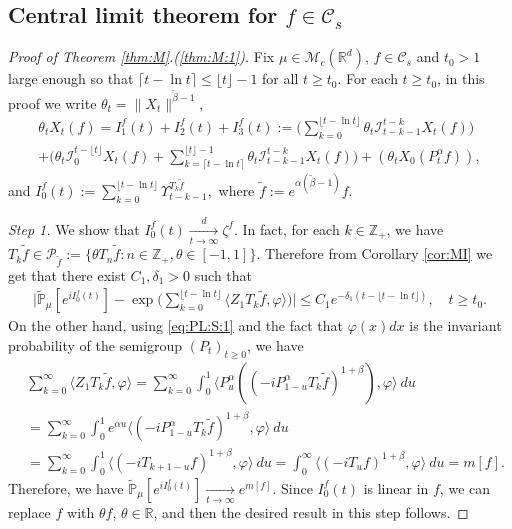 \documentclass[12pt,a4paper]{amsart}
\theoremstyle{plain}
\theoremstyle{definition}
\numberwithin{equation}{section}
\begin{document}
\subsection{Central limit theorem for $f\in \mathcal C_s$}
\label{sec: small rate}

\begin{proof}[Proof of Theorem \ref{thm:M}.(\ref{thm:M:1})]
	Fix $\mu\in \mathcal M_c(\mathbb R^d)$, $f\in \mathcal C_s$ and $t_0 > 1$  large enough so that $ \lceil t - \ln t\rceil \leq \lfloor t \rfloor - 1$ for all $t\geq t_0$.
  For each $t\geq t_0$, in this proof we write $\theta_t = \|X_t\|^{\tilde \beta - 1}$,
  \begin{multline}
    \label{eq:PM:CLTS:1}
    \theta_t  X_t(f)
    = I^f_1(t) + I^f_2(t) + I^f_3(t)
    := \Big(\sum_{k=0}^{\lfloor t-\ln t \rfloor} \theta_t \mathcal I_{t-k-1}^{t-k} X_t(f) \Big)\\
    + \Big( \theta_t \mathcal I_0^{t-\lfloor t \rfloor} X_t(f)   + \sum_{k=\lceil t-\ln t \rceil}^{\lfloor t \rfloor-1} \theta_t \mathcal I_{t-k-1}^{t-k} X_t(f) \Big) + (\theta_t X_0(P_t^\alpha f) ),
  \end{multline}
  and $ I^f_0(t) := \sum_{k=0}^{\lfloor t-\ln t \rfloor} \Upsilon_{t-k-1}^{T_k \tilde f},$ where $\tilde f:= e^{\alpha(\tilde \beta - 1)} f$.

  \emph{Step 1.} We show that $I^f_0(t) \xrightarrow[t\to \infty]{d} \zeta^f$.
  In fact, for each $k \in \mathbb Z_+$, we have  $T_{k} \tilde f \in \mathcal P_{\tilde f}:=\{\theta T_n \tilde f: n \in \mathbb Z_+, \theta \in [-1,1]\}$.
  Therefore from Corollary \ref{cor:MI} we get that there exist $C_1,\delta_1 > 0$ such that
  \begin{align}
    \Big|\mathbb{\widetilde{P}}_{\mu} [e^{i I^f_0(t)} ]-\exp\Big(\sum_{k=0}^{\lfloor t-\ln t \rfloor} \langle Z_1T_{k}\tilde f, \varphi\rangle \Big)\Big|
    \leq C_1 e^{-\delta_1(t - \lfloor t - \ln t\rfloor)},
    \quad t\geq t_0.
  \end{align}
  On the other hand, using \eqref{eq:PL:S:1} and the fact that $\varphi(x)dx$ is the invariant probability of the semigroup $(P_t)_{t\geq 0}$, we have
  \begin{align}
    \label{eq:PM:CLTS:2}
    & \sum_{k=0}^\infty \langle Z_1 T_{k} \tilde f, \varphi \rangle
    = \sum_{k=0}^\infty \int_0^1 \langle P_u^\alpha ((-iP_{1 - u}^\alpha T_k \tilde f)^{1+\beta}), \varphi\rangle ~du
    \\& = \sum_{k=0}^\infty \int_0^1 e^{\alpha u} \langle  (-iP_{1 - u}^\alpha T_{k}\tilde f)^{1+\beta}, \varphi \rangle ~du
    \\& = \sum_{k=0}^\infty \int_0^1 \langle  (-iT_{k+1 - u} f)^{1+\beta}, \varphi\rangle~du
    = \int_0^\infty \langle  (-iT_{u} f)^{1+\beta}, \varphi\rangle~du = m[f].
  \end{align}
  Therefore, we have $\mathbb{\widetilde{P}}_{\mu} [e^{i I^f_0(t)} ] \xrightarrow[t\to \infty]{} e^{m[f]}$. Since $I_0^f(t)$ is linear in $f$, we can replace $f$ with $\theta f$, $\theta \in \mathbb R$, and then the desired result in this step follows.


\end{proof}
\end{document}
